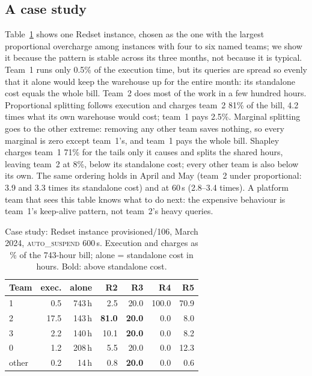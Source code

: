 \documentclass[sigconf]{acmart}
\newcommand{\autos}{\textsc{auto\_suspend}}
\begin{document}
\subsection{A case study}\label{sec:case}
Table~\ref{tab:case} shows one Redset instance, chosen as the one with the largest proportional overcharge among instances
with four to six named teams; we show it because the pattern is stable across its three months, not because it is typical.
Team~1 runs only 0.5\% of the execution time, but its queries are spread so evenly that it alone would keep the warehouse
up for the entire month: its standalone cost equals the whole bill. Team~2 does most of the work in a few hundred hours.
Proportional splitting follows execution and charges team~2 81\% of the bill, 4.2 times what its own warehouse would cost;
team~1 pays 2.5\%. Marginal splitting goes to the other extreme: removing any other team saves nothing, so every
marginal is zero except team~1's, and team~1 pays the whole bill. Shapley charges team~1 71\% for the tails only it causes
and splits the shared hours, leaving team~2 at 8\%, below its standalone cost; every other team is also below its own.
The same ordering holds in April and May (team~2 under proportional: 3.9 and 3.3 times its standalone cost) and at
60\,s (2.8--3.4 times). A platform team that sees this table knows what to do next: the expensive behaviour is team~1's
keep-alive pattern, not team~2's heavy queries.

\begin{table}[t]
\caption{Case study: Redset instance provisioned/106, March 2024, \autos{} 600\,s. Execution and charges as \% of the
743-hour bill; alone = standalone cost in hours. Bold: above standalone cost.}\label{tab:case}
\small
\setlength{\tabcolsep}{3.5pt}
\begin{tabular}{lrrrrrr}
\toprule
Team & exec. & alone & R2 & R3 & R4 & R5 \\
\midrule
1       & 0.5 & 743\,h & 2.5  & 20.0 & 100.0 & 70.9 \\
2       & 17.5 & 143\,h & \textbf{81.0} & \textbf{20.0} & 0.0 & 8.0 \\
3       & 2.2 & 140\,h & 10.1 & \textbf{20.0} & 0.0 & 8.2 \\
0       & 1.2 & 208\,h & 5.5  & 20.0 & 0.0 & 12.3 \\
other   & 0.2 & 14\,h  & 0.8  & \textbf{20.0} & 0.0 & 0.6 \\
\bottomrule
\end{tabular}
\end{table}
\end{document}
